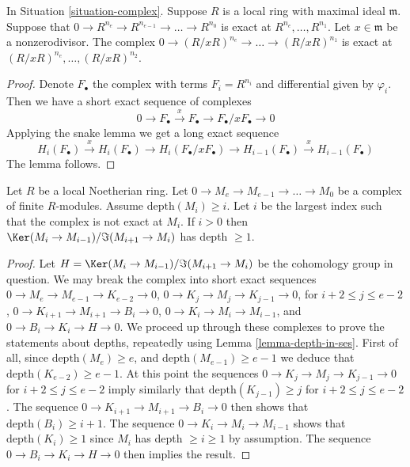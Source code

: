 \begin{lemma}
\label{lemma-div-x-exact-one-less}
In Situation \ref{situation-complex}. Suppose $R$ is
a local ring with maximal ideal $\mathfrak m$.
Suppose that $0 \to R^{n_e} \to R^{n_{e-1}} \to \ldots \to R^{n_0}$
is exact at $R^{n_e}, \ldots, R^{n_1}$.
Let $x \in \mathfrak m$ be a nonzerodivisor. The complex
$0 \to (R/xR)^{n_e} \to \ldots \to (R/xR)^{n_1}$
is exact at $(R/xR)^{n_e}, \ldots, (R/xR)^{n_2}$.
\end{lemma}

\begin{proof}
Denote $F_\bullet$ the complex with terms $F_i = R^{n_i}$
and differential given by $\varphi_i$. Then we have a short
exact sequence of complexes
$$
0 \to F_\bullet \xrightarrow{x} F_\bullet \to F_\bullet/xF_\bullet \to 0
$$
Applying the snake lemma we get a long exact sequence
$$
H_i(F_\bullet) \xrightarrow{x} H_i(F_\bullet) \to
H_i(F_\bullet/xF_\bullet) \to H_{i - 1}(F_\bullet)
\xrightarrow{x} H_{i - 1}(F_\bullet)
$$
The lemma follows.
\end{proof}

\begin{lemma}
\label{lemma-acyclic}
\begin{reference}
\cite[Lemma 1.8]{Peskine-Szpiro}
\end{reference}
Let $R$ be a local Noetherian ring.
Let $0 \to M_e \to M_{e-1} \to \ldots \to M_0$
be a complex of finite $R$-modules.
Assume $\text{depth}(M_i) \geq i$.
Let $i$ be the largest index such that the complex is
not exact at $M_i$. If $i > 0$ then
$\Ker(M_i \to M_{i-1})/\Im(M_{i + 1} \to M_i)$
has depth $\geq 1$.
\end{lemma}

\begin{proof}
Let $H = \Ker(M_i \to M_{i-1})/\Im(M_{i + 1} \to M_i)$ be the
cohomology group in question.
We may break the complex into short exact sequences
$0 \to M_e \to M_{e-1} \to K_{e-2} \to 0$,
$0 \to K_j \to M_j \to K_{j-1} \to 0$, for $i + 2 \leq j \leq e-2 $,
$0 \to K_{i + 1} \to M_{i + 1} \to B_i \to 0$,
$0 \to K_i \to M_i \to M_{i-1}$, and
$0 \to B_i \to K_i \to H \to 0$.
We proceed up through these complexes to
prove the statements about depths, repeatedly using
Lemma \ref{lemma-depth-in-ses}.
First of all, since $\text{depth}(M_e) \geq e$,
and $\text{depth}(M_{e-1}) \geq e-1$ we deduce
that $\text{depth}(K_{e-2}) \geq e - 1$. At this point the
sequences $0 \to K_j \to M_j \to K_{j-1} \to 0$ for $i + 2 \leq j \leq e-2 $
imply similarly that $\text{depth}(K_{j-1}) \geq j$ for
$i + 2 \leq j \leq e-2$. The sequence
$0 \to K_{i + 1} \to M_{i + 1} \to B_i \to 0$
then shows that $\text{depth}(B_i) \geq i + 1$. The sequence
$0 \to K_i \to M_i \to M_{i-1}$ shows that $\text{depth}(K_i) \geq 1$
since $M_i$ has depth $\geq i \geq 1$ by assumption.
The sequence $0 \to B_i \to K_i \to H \to 0$ then
implies the result.
\end{proof}

